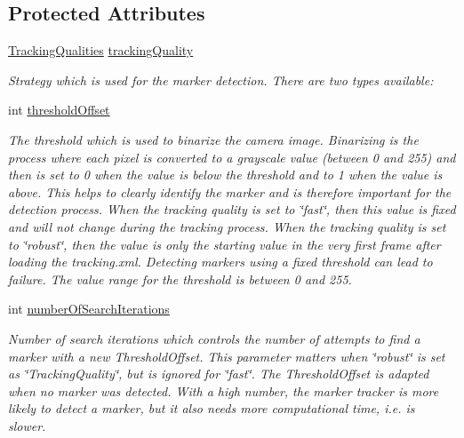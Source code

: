 \subsection*{Protected Attributes}
\begin{DoxyCompactItemize}
\item 
\hyperlink{class_a_rdev_kit_1_1_model_1_1_project_1_1_picture_marker_sensor_aff811596849fce290f77dea5f63b16c6}{Tracking\-Qualities} \hyperlink{class_a_rdev_kit_1_1_model_1_1_project_1_1_picture_marker_sensor_aca44e5fc01c413ccf52a6566ee98ec70}{tracking\-Quality}
\begin{DoxyCompactList}\small\item\em Strategy which is used for the marker detection. There are two types available\-: \end{DoxyCompactList}\item 
int \hyperlink{class_a_rdev_kit_1_1_model_1_1_project_1_1_picture_marker_sensor_ae8164ddea1bcb20ca7f5b3e646b6c924}{threshold\-Offset}
\begin{DoxyCompactList}\small\item\em The threshold which is used to binarize the camera image. Binarizing is the process where each pixel is converted to a grayscale value (between 0 and 255) and then is set to 0 when the value is below the threshold and to 1 when the value is above. This helps to clearly identify the marker and is therefore important for the detection process. When the tracking quality is set to \char`\"{}fast\char`\"{}, then this value is fixed and will not change during the tracking process. When the tracking quality is set to \char`\"{}robust\char`\"{}, then the value is only the starting value in the very first frame after loading the tracking.\-xml. Detecting markers using a fixed threshold can lead to failure. The value range for the threshold is between 0 and 255. \end{DoxyCompactList}\item 
int \hyperlink{class_a_rdev_kit_1_1_model_1_1_project_1_1_picture_marker_sensor_a5a3468a9f180fdb258a72e60a92423ad}{number\-Of\-Search\-Iterations}
\begin{DoxyCompactList}\small\item\em Number of search iterations which controls the number of attempts to find a marker with a new Threshold\-Offset. This parameter matters when \char`\"{}robust\char`\"{} is set as \char`\"{}\-Tracking\-Quality\char`\"{}, but is ignored for \char`\"{}fast\char`\"{}. The Threshold\-Offset is adapted when no marker was detected. With a high number, the marker tracker is more likely to detect a marker, but it also needs more computational time, i.\-e. is slower. \end{DoxyCompactList}\end{DoxyCompactItemize}
